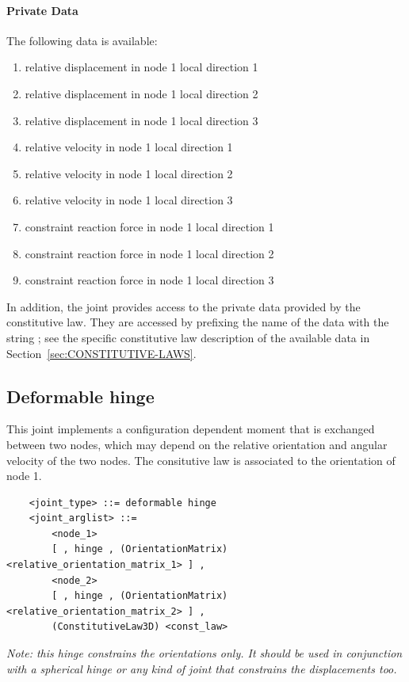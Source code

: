 \paragraph{Private Data}
The following data is available:
\begin{enumerate}
\item {} relative displacement in node 1 local direction 1
\item {} relative displacement in node 1 local direction 2
\item {} relative displacement in node 1 local direction 3
\item {} relative velocity in node 1 local direction 1
\item {} relative velocity in node 1 local direction 2
\item {} relative velocity in node 1 local direction 3
\item {} constraint reaction force in node 1 local direction 1
\item {} constraint reaction force in node 1 local direction 2
\item {} constraint reaction force in node 1 local direction 3
\end{enumerate}
In addition, the joint provides
access to the private data provided by the constitutive law.
They are accessed by prefixing the name of the data with the string
; see the specific constitutive law
description of the available data in Section~\ref{sec:CONSTITUTIVE-LAWS}.




\subsection{Deformable hinge}\label{sec:EL:JOINT:DEFORMABLEHINGE}
This joint implements a configuration dependent moment that is exchanged
between two nodes, which may depend on the relative orientation and angular
velocity of the two nodes.
The consitutive law is associated to the orientation of node 1.
\begin{verbatim}
    <joint_type> ::= deformable hinge
    <joint_arglist> ::= 
        <node_1>
        [ , hinge , (OrientationMatrix) <relative_orientation_matrix_1> ] ,
        <node_2> 
        [ , hinge , (OrientationMatrix) <relative_orientation_matrix_2> ] ,
        (ConstitutiveLaw3D) <const_law>
\end{verbatim}
\emph{Note: this hinge constrains the orientations only.
    It should be used in conjunction with a spherical hinge or any kind of
    joint that constrains the displacements too.}

